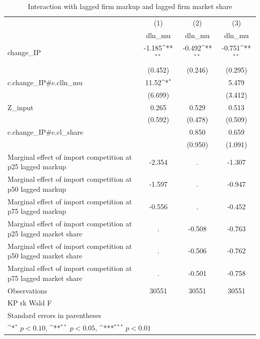 \begin{table}[htbp]\centering
\def\sym#1{\ifmmode^{#1}\else\(^{#1}\)\fi}
\caption{Interaction with lagged firm markup and lagged firm market share}
\begin{tabular}{l*{3}{c}}
\hline\hline
            &\multicolumn{1}{c}{(1)}&\multicolumn{1}{c}{(2)}&\multicolumn{1}{c}{(3)}\\
            &\multicolumn{1}{c}{dln\_mu}&\multicolumn{1}{c}{dln\_mu}&\multicolumn{1}{c}{dln\_mu}\\
\hline
change\_IP   &      -1.185\sym{**} &      -0.492\sym{**} &      -0.751\sym{**} \\
            &     (0.452)         &     (0.246)         &     (0.295)         \\
[1em]
c.change\_IP#c.clln\_mu&       11.52\sym{*}  &                     &       5.479         \\
            &     (6.699)         &                     &     (3.412)         \\
[1em]
Z\_input     &       0.265         &       0.529         &       0.513         \\
            &     (0.592)         &     (0.478)         &     (0.509)         \\
[1em]
c.change\_IP#c.cl\_share&                     &       0.850         &       0.659         \\
            &                     &     (0.950)         &     (1.091)         \\
\hline
Marginal effect of import competition at p25 lagged markup&      -2.354         &           .         &      -1.307         \\
Marginal effect of import competition at p50 lagged markup&      -1.597         &           .         &      -0.947         \\
Marginal effect of import competition at p75 lagged markup&      -0.556         &           .         &      -0.452         \\
Marginal effect of import competition at p25 lagged market share&           .         &      -0.508         &      -0.763         \\
Marginal effect of import competition at p50 lagged market share&           .         &      -0.506         &      -0.762         \\
Marginal effect of import competition at p75 lagged market share&           .         &      -0.501         &      -0.758         \\
Observations&       30551         &       30551         &       30551         \\
KP rk Wald F&                     &                     &                     \\
\hline\hline
\multicolumn{4}{l}{\footnotesize Standard errors in parentheses}\\
\multicolumn{4}{l}{\footnotesize \sym{*} \(p<0.10\), \sym{**} \(p<0.05\), \sym{***} \(p<0.01\)}\\
\end{tabular}
\end{table}
